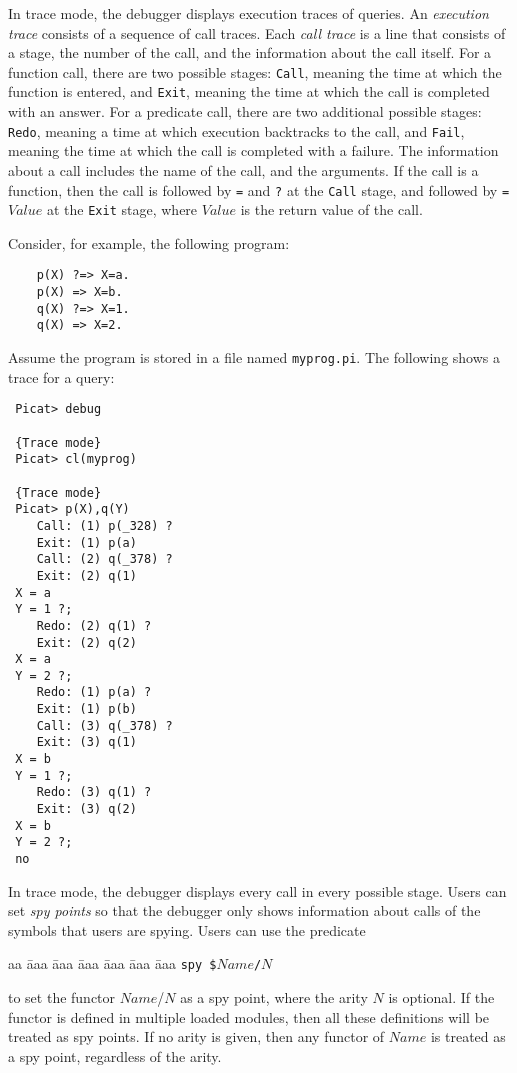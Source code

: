 In trace mode, the debugger displays execution traces of queries. An \emph{execution trace} consists of a sequence of call traces. Each \emph{call trace} is a line that consists of a stage, the number of the call, and the information about the call itself. For a function call, there are two possible stages: \texttt{Call}, meaning the time at which the function is entered, and \texttt{Exit},  meaning the time at which the call is completed with an answer. For a predicate call, there are two additional possible stages: \texttt{Redo}, meaning a time at which execution backtracks to the call, and \texttt{Fail}, meaning the time at which the call is completed with a failure. The information about a call includes the name of the call, and the arguments. If the call is a function, then the call is followed by \texttt{=} and \texttt{?} at the \texttt{Call} stage, and followed by \texttt{= $Value$} at the \texttt{Exit} stage, where $Value$ is the return value of the call. 

Consider, for example, the following program:
\begin{verbatim}
    p(X) ?=> X=a.
    p(X) => X=b.
    q(X) ?=> X=1.
    q(X) => X=2.
\end{verbatim}
Assume the program is stored in a file named \texttt{myprog.pi}. The following shows a trace for a query:
\begin{verbatim}
 Picat> debug

 {Trace mode}
 Picat> cl(myprog)

 {Trace mode}
 Picat> p(X),q(Y)  
    Call: (1) p(_328) ?
    Exit: (1) p(a) 
    Call: (2) q(_378) ?
    Exit: (2) q(1) 
 X = a
 Y = 1 ?;
    Redo: (2) q(1) ?
    Exit: (2) q(2) 
 X = a
 Y = 2 ?;
    Redo: (1) p(a) ?
    Exit: (1) p(b) 
    Call: (3) q(_378) ?
    Exit: (3) q(1) 
 X = b
 Y = 1 ?;
    Redo: (3) q(1) ?
    Exit: (3) q(2) 
 X = b
 Y = 2 ?;
 no
\end{verbatim}

In trace mode, the debugger displays every call in every possible stage. Users can set \emph{spy points} so that the debugger only shows information about calls of the symbols that users are spying. Users can use the predicate 
\begin{tabbing}
aa \= aaa \= aaa \= aaa \= aaa \= aaa \= aaa \kill
\> \texttt{spy \$$Name$/$N$} 
\end{tabbing}
to set the functor $Name$/$N$ as a spy point, where the arity $N$ is optional. If the functor is defined in multiple loaded modules, then all these definitions will be treated as spy points. If no arity is given, then any functor of $Name$ is treated as a spy point, regardless of the arity.

